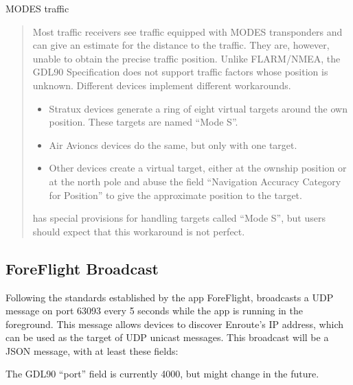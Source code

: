 \documentclass[letterpaper,10pt,english]{sphinxmanual}
\begin{document}
\sphinxAtStartPar
MODE\sphinxhyphen{}S traffic
\begin{quote}

\sphinxAtStartPar
Most traffic receivers see traffic equipped with MODE\sphinxhyphen{}S transponders and can
give an estimate for the distance to the traffic.  They are, however, unable
to obtain the precise traffic position.  Unlike FLARM/NMEA, the GDL90
Specification does not support traffic factors whose position is unknown.
Different devices implement different workarounds.
\begin{itemize}
\item {} 
\sphinxAtStartPar
Stratux devices generate a ring of eight virtual targets around the own
position.  These targets are named “Mode S”.

\item {} 
\sphinxAtStartPar
Air Avioncs devices do the same, but only with one target.

\item {} 
\sphinxAtStartPar
Other devices create a virtual target, either at the ownship position or at
the north pole and abuse the field “Navigation Accuracy Category for
Position” to give the approximate position to the target.

\end{itemize}

\sphinxAtStartPar
{} has special provisions for handling targets
called “Mode S”, but users should expect that this workaround is not perfect.
\end{quote}


\subsection{ForeFlight Broadcast}
\label{\detokenize{04-appendix/technical:foreflight-broadcast}}
\sphinxAtStartPar
Following the standards established by the app ForeFlight,  broadcasts a UDP message on port 63093 every 5 seconds while the
app is running in the foreground.  This message allows devices to discover
Enroute’s IP address, which can be used as the target of UDP unicast messages.
This broadcast will be a JSON message, with at least these fields:

\begin{sphinxVerbatim}[commandchars=\\\{\}]
\end{sphinxVerbatim}

\sphinxAtStartPar
The GDL90 “port” field is currently 4000, but might change in the future.



\renewcommand{\indexname}{Index}
\footnotesize\raggedright\printindex
\end{document}
